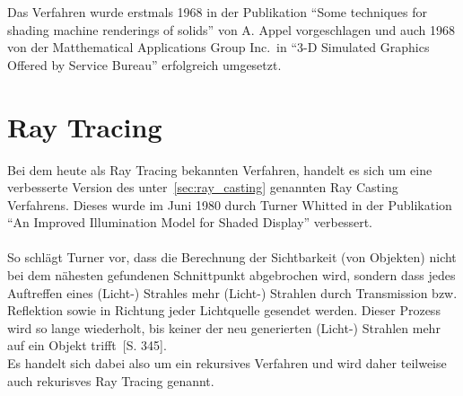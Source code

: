 Das Verfahren wurde erstmals 1968 in der Publikation ``Some techniques for
shading machine renderings of solids'' von A. Appel vorgeschlagen und auch 1968
von der Matthematical Applications Group Inc.\ in ``3-D Simulated Graphics
Offered by Service Bureau'' erfolgreich umgesetzt.

\newpage{}

\section{Ray Tracing}
\label{sec:ray_tracing}

Bei dem heute als Ray Tracing bekannten Verfahren, handelt es sich um eine
verbesserte Version des unter~\ref{sec:ray_casting} genannten Ray Casting
Verfahrens. Dieses wurde im Juni 1980 durch Turner Whitted in der Publikation
``An Improved Illumination Model for Shaded Display'' verbessert.\\
\\
So schlägt Turner vor, dass die Berechnung der Sichtbarkeit (von Objekten)
nicht bei dem nähesten gefundenen Schnittpunkt abgebrochen wird, sondern dass
jedes Auftreffen eines (Licht-) Strahles mehr (Licht-) Strahlen durch
Transmission bzw. Reflektion sowie in Richtung jeder Lichtquelle gesendet
werden. Dieser Prozess wird so lange wiederholt, bis keiner der neu generierten
(Licht-) Strahlen mehr auf ein Objekt trifft~\cite{whitted_improved_1980}[S.
345].\\
Es handelt sich dabei also um ein rekursives Verfahren und wird daher
teilweise auch rekurisves Ray Tracing genannt.
